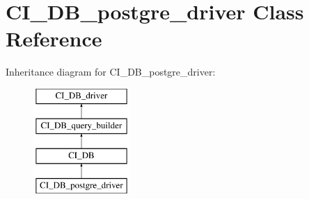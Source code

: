 \hypertarget{class_c_i___d_b__postgre__driver}{}\section{C\+I\+\_\+\+D\+B\+\_\+postgre\+\_\+driver Class Reference}
\label{class_c_i___d_b__postgre__driver}
Inheritance diagram for C\+I\+\_\+\+D\+B\+\_\+postgre\+\_\+driver\+:\begin{figure}[H]
\begin{center}
\leavevmode
\includegraphics[height=4.000000cm]{class_c_i___d_b__postgre__driver}
\end{center}
\end{figure}
